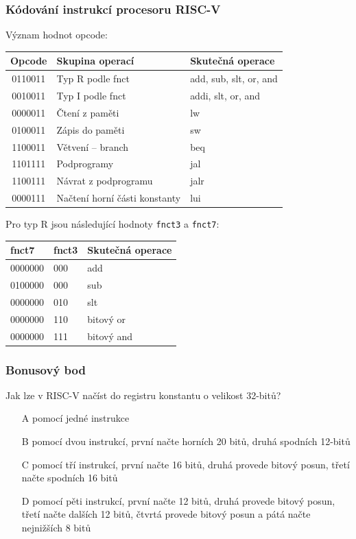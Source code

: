 \documentclass{beamer}
\begin{document}
\begin{frame}
\frametitle{Kódování instrukcí procesoru RISC-V}

Význam hodnot opcode:
\begin{table}
\footnotesize
\begin{tabular}{|c|l|l|}\hline
Opcode & Skupina operací & Skutečná operace \\ \hline
0110011 & Typ R podle fnct & add, sub, slt, or, and \\ \hline
0010011 & Typ I podle fnct & addi, slt, or, and \\ \hline
0000011 & Čtení z paměti & lw \\ \hline
0100011 & Zápis do paměti & sw \\ \hline
1100011 & Větvení -- branch & beq \\ \hline
1101111 & Podprogramy & jal \\ \hline
1100111 & Návrat z podprogramu & jalr \\ \hline
0000111 & Načtení horní části konstanty & lui \\ \hline
\end{tabular}
\end{table}

Pro typ R jsou následující hodnoty \texttt{fnct3} a \texttt{fnct7}:
\begin{table}
\footnotesize
\begin{tabular}{|l|l|l|}\hline
fnct7 & fnct3 & Skutečná operace \\ \hline
0000000 & 000  & add \\ \hline
0100000 & 000  & sub \\ \hline
0000000 & 010  & slt \\ \hline
0000000 & 110  & bitový or \\ \hline
0000000 & 111  & bitový and \\ \hline
\end{tabular}
\end{table}

\end{frame}

\begin{frame}
\frametitle{Bonusový bod}

Jak lze v RISC-V načíst do registru konstantu o velikost 32-bitů?
\begin{itemize}
\item[A] pomocí jedné instrukce
\item[B] pomocí dvou instrukcí, první načte horních 20 bitů, druhá spodních 12-bitů
\item[C] pomocí tří instrukcí, první načte 16 bitů, druhá provede bitový posun, třetí načte spodních 16 bitů
\item[D] pomocí pěti instrukcí, první načte 12 bitů, druhá provede bitový posun, třetí načte dalších 12 bitů, čtvrtá provede bitový posun a pátá načte nejnižších 8 bitů 
\end{itemize}
\end{frame}
\end{document}

